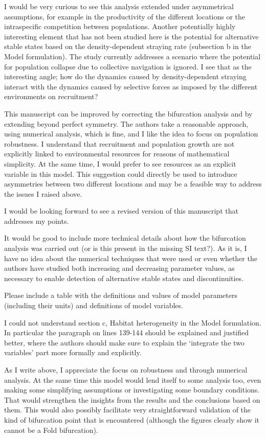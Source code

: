 \documentclass[ucm,12pt]{ucletter}
\newcounter{section}
\newcounter{subsection}[section]
\begin{document}
\begin{letter}
I would be very curious to see this analysis extended under asymmetrical assumptions, for example in the productivity of the different locations or the intraspecific competition between populations. Another potentially highly interesting element that has not been studied here is the potential for alternative stable states based on the density-dependent straying rate (subsection b in the Model formulation). The study currently addresses a scenario where the potential for population collapse due to collective navigation is ignored. I see that as the interesting angle; how do the dynamics caused by density-dependent straying interact with the dynamics caused by selective forces as imposed by the different environments on recruitment?

This manuscript can be improved by correcting the bifurcation analysis and by extending beyond perfect symmetry. The authors take a reasonable approach, using numerical analysis, which is fine, and I like the idea to focus on population robustness.  I understand that recruitment and population growth are not explicitly linked to environmental resources for reasons of mathematical simplicity. At the same time, I would prefer to see resources as an explicit variable in this model. This suggestion could directly be used to introduce asymmetries between two different locations and may be a feasible way to address the issues I raised above.

I would be looking forward to see a revised version of this manuscript that addresses my points.


It would be good to include more technical details about how the bifurcation analysis was carried out (or is this present in the missing SI text?). As it is, I have no idea about the numerical techniques that were used or even whether the authors have studied both increasing and decreasing parameter values, as necessary to enable detection of alternative stable states and discontinuities.

Please include a table with the definitions and values of model parameters (including their units) and definitions of model variables.

I could not understand section c, Habitat heterogeneity in the Model formulation. In particular the paragraph on lines 139-144 should be explained and justified better, where the authors should make sure to explain the ‘integrate the two variables’ part more formally and explicitly.

As I write above, I appreciate the focus on robustness and through numerical analysis. At the same time this model would lend itself to some analysis too, even making some simplifying assumptions or investigating some boundary conditions. That would strengthen the insights from the results and the conclusions based on them. This would also possibly facilitate very straightforward validation of the kind of bifurcation point that is encountered (although the figures clearly show it cannot be a Fold bifurcation).


\end{letter}
\end{document}
